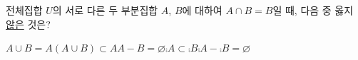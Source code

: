 전체집합 $U$의 서로 다른 두 부분집합 $A$, $B$에 대하여 $A\cap B=B$일 때, 다음 중 옳지 \underline{않은} 것은?
\begin{choicesii}{$A\cup B=A$}{$(A\cup B)\subset A$}{$A-B=\varnothing$}{$\comp{A}\subset\comp{B}$}{$\comp{A}-\comp{B}=\varnothing$}\end{choicesii}
